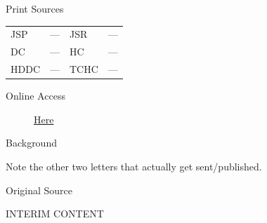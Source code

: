 			\begin{description}
				\item[Print Sources]
			\end{description}

				\begin{tabular}{p{0.5in}p{1in}p{0.5in}p{1in}}
				JSP	 	& ---		& JSR 		& --- \\
				DC	 	& ---		& HC 		& --- \\
				HDDC 	& ---		& TCHC 		& --- \\
				\end{tabular}
			
			\begin{description}
				\item[Online Access] \href{https://www.josephsmithpapers.org/paper-summary/letter-to-presidential-candidates-4-november-1843-draft/1}{Here}
			\end{description}
			
			\begin{description}
				\item[Background]
			\end{description}
			
				Note the other two letters that actually get sent/published.
			
			
			\begin{description}
				\item[Original Source]
			\end{description}
			
				INTERIM CONTENT
			
			
